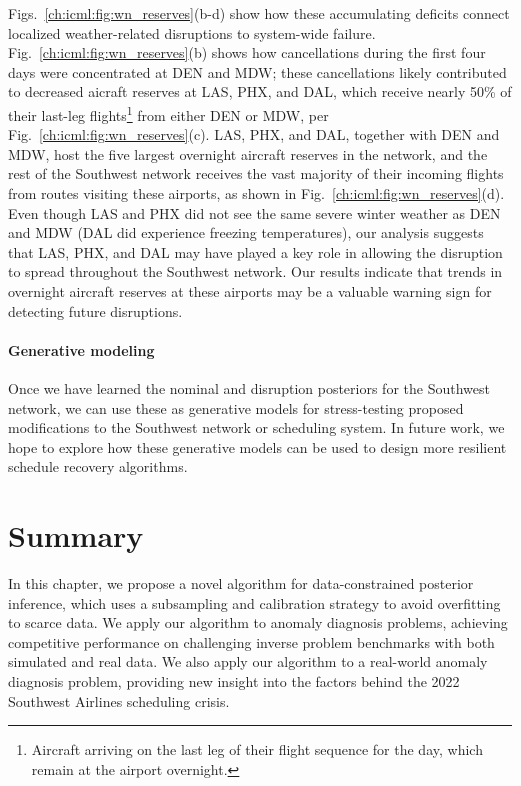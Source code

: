 Figs.~\ref{ch:icml:fig:wn_reserves}(b-d) show how these accumulating deficits connect localized weather-related disruptions to system-wide failure. Fig.~\ref{ch:icml:fig:wn_reserves}(b) shows how cancellations during the first four days were concentrated at DEN and MDW; these cancellations likely contributed to decreased aicraft reserves at LAS, PHX, and DAL, which receive nearly 50\% of their last-leg flights\footnote{Aircraft arriving on the last leg of their flight sequence for the day, which remain at the airport overnight.} from either DEN or MDW, per Fig.~\ref{ch:icml:fig:wn_reserves}(c). LAS, PHX, and DAL, together with DEN and MDW, host the five largest overnight aircraft reserves in the network, and the rest of the Southwest network receives the vast majority of their incoming flights from routes visiting these airports, as shown in Fig.~\ref{ch:icml:fig:wn_reserves}(d). Even though LAS and PHX did not see the same severe winter weather as DEN and MDW (DAL did experience freezing temperatures), our analysis suggests that LAS, PHX, and DAL may have played a key role in allowing the disruption to spread throughout the Southwest network. Our results indicate that trends in overnight aircraft reserves at these airports may be a valuable warning sign for detecting future disruptions.

\paragraph{Generative modeling} Once we have learned the nominal and disruption posteriors for the Southwest network, we can use these as generative models for stress-testing proposed modifications to the Southwest network or scheduling system. In future work, we hope to explore how these generative models can be used to design more resilient schedule recovery algorithms.

\section{Summary}\label{ch:icml:conclusion}

In this chapter, we propose a novel algorithm for data-constrained posterior inference, which uses a subsampling and calibration strategy to avoid overfitting to scarce data. We apply our algorithm to anomaly diagnosis problems, achieving competitive performance on challenging inverse problem benchmarks with both simulated and real data. We also apply our algorithm to a real-world anomaly diagnosis problem, providing new insight into the factors behind the 2022 Southwest Airlines scheduling crisis.

